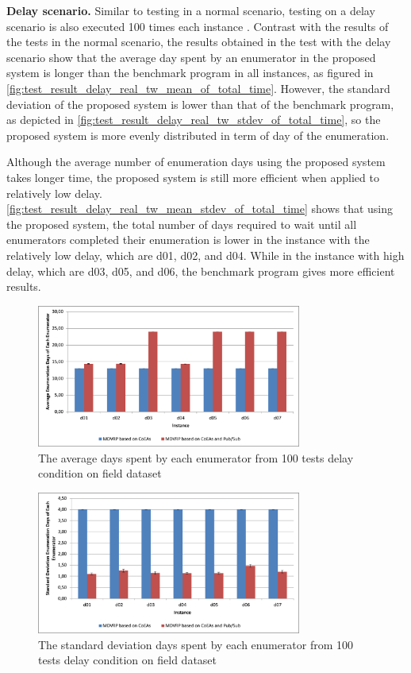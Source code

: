 \documentclass[conference]{IEEEtran}
\begin{document}
\textbf{Delay scenario.} Similar to testing in a normal scenario, testing on a delay scenario is also executed 100 times each instance . Contrast with the results of the tests in the normal scenario, the results obtained in the test with the delay scenario show that the average day spent by an enumerator in the proposed system is longer than the benchmark program in all instances, as figured in \autoref{fig:test_result_delay_real_tw_mean_of_total_time}. However, the standard deviation of the proposed system is lower than that of the benchmark program, as depicted in \autoref{fig:test_result_delay_real_tw_stdev_of_total_time}, so the proposed system is more evenly distributed in term of day of the enumeration.

Although the average number of enumeration days using the proposed system takes longer time, the proposed system is still more efficient when applied to relatively low delay. \autoref{fig:test_result_delay_real_tw_mean_stdev_of_total_time} shows that using the proposed system, the total number of days required to wait until all enumerators completed their enumeration is lower in the instance with the relatively low delay, which are d01, d02, and d04. While in the instance with high delay, which are d03, d05, and d06, the benchmark program gives more efficient results.

\begin{figure}[!]
	\centering
	\includegraphics[width=8.7cm]{Resources/Images/test_result_delay_real_tw_mean_of_total_time_en}
	\caption{The average days spent by each enumerator from 100 tests delay condition on field dataset}
	\label{fig:test_result_delay_real_tw_mean_of_total_time}
\end{figure}

\begin{figure}[!]
	\centering
	\includegraphics[width=8.7cm]{Resources/Images/test_result_delay_real_tw_stdev_of_total_time_en}
	\caption{The standard deviation days spent by each enumerator from 100 tests delay condition on field dataset}
	\label{fig:test_result_delay_real_tw_stdev_of_total_time}
\end{figure}
\end{document}
